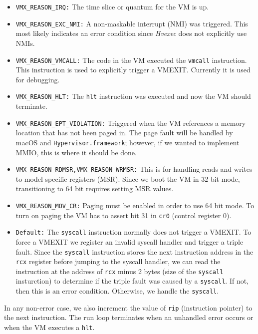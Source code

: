 \documentclass{article}
\newcommand{\PROJNAME}{\textit{Hvexec}}
\begin{document}
\begin{itemize}
    \item \texttt{VMX\_REASON\_IRQ:}
        The time slice or quantum for the VM is up.
    \item \texttt{VMX\_REASON\_EXC\_NMI:}
        A non-maskable interrupt (NMI) was triggered. This most likely indicates an error condition since \PROJNAME{} does not explicitly use NMIs.
    \item \texttt{VMX\_REASON\_VMCALL:}
        The code in the VM executed the \texttt{vmcall} instruction. This instruction is used to explicitly trigger a VMEXIT. Currently it is used for debugging.
    \item \texttt{VMX\_REASON\_HLT:}
        The \texttt{hlt} instruction was executed and now the VM should terminate.
    \item \texttt{VMX\_REASON\_EPT\_VIOLATION:}
        Triggered when the VM references a memory location that has not been paged in. The page fault will be handled by macOS and \texttt{Hypervisor.framework}; however, if we wanted to implement MMIO, this is where it should be done.
    \item \texttt{VMX\_REASON\_RDMSR,VMX\_REASON\_WRMSR:}
        This is for handling reads and writes to model specific registers (MSR). Since we boot the VM in 32 bit mode, transitioning to 64 bit requires setting MSR values.
    \item \texttt{VMX\_REASON\_MOV\_CR:}
        Paging must be enabled in order to use 64 bit mode. To turn on paging the VM has to assert bit 31 in \texttt{cr0} (control register 0).
    \item \texttt{Default:}
        The \texttt{syscall} instruction normally does not trigger a VMEXIT. To force a VMEXIT we register an invalid syscall handler and trigger a triple fault. 
        Since the \texttt{syscall} instruction stores the next instruction address in the \texttt{rcx} register before jumping to the syscall handler, we can read the instruction at the address of \texttt{rcx} minus 2 bytes (size of the \texttt{syscall} insturction) to determine if the triple fault was caused by a \texttt{syscall}. If not, then this is an error condition. Otherwise, we handle the \texttt{syscall}.
\end{itemize}

In any non-error case, we also increment the value of \texttt{rip} (instruction pointer) to the next instruction. The run loop terminates when an unhandled error occurs or when the VM executes a \texttt{hlt}. 
 
\end{document}
